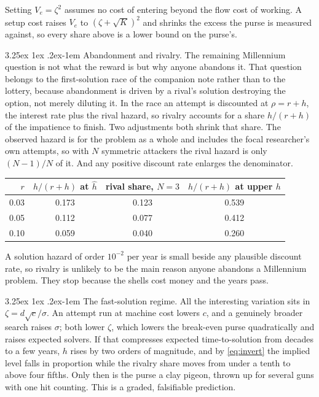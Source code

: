 \documentclass[11pt]{article}
\makeatletter
\renewcommand\paragraph{\@startsection{paragraph}{4}{\z@}%
  {3.25ex \@plus1ex \@minus.2ex}{-1em}%
  {\normalfont\normalsize\itshape}}
\theoremstyle{itheads}
\makeatother
\begin{document}
Setting $V_{e}=\zeta^{2}$ assumes no cost of entering beyond the flow cost
of working. A setup cost raises $V_{e}$ to $(\zeta+\sqrt K)^{2}$ and shrinks
the excess the purse is measured against, so every share above is a lower
bound on the purse's.

\paragraph{Abandonment and rivalry.}
The remaining Millennium question is not what the reward is but why anyone
abandons it. That question belongs to the first-solution race of the
companion note rather than to the lottery, because abandonment is driven by
a rival's solution destroying the option, not merely diluting it. In the
race an attempt is discounted at $\rho=r+h$, the interest rate plus the
rival hazard, so rivalry accounts for a share $h/(r+h)$ of the impatience to
finish. Two adjustments both shrink that share. The observed hazard is for
the problem as a whole and includes the focal researcher's own attempts, so
with $N$ symmetric attackers the rival hazard is only $(N-1)/N$ of it. And
any positive discount rate enlarges the denominator.

\begin{center}
\begin{tabular}{rccc}
\toprule
$r$ & $h/(r+h)$ at $\hat h$ & rival share, $N=3$ & $h/(r+h)$ at upper $h$\\
\midrule
0.03 & 0.173 & 0.123 & 0.539\\
0.05 & 0.112 & 0.077 & 0.412\\
0.10 & 0.059 & 0.040 & 0.260\\
\bottomrule
\end{tabular}
\end{center}

A solution hazard of order $10^{-2}$ per year is small beside any plausible
discount rate, so rivalry is unlikely to be the main reason anyone abandons
a Millennium problem. They stop because the shells cost money and the years
pass.

\paragraph{The fast-solution regime.}
All the interesting variation sits in $\zeta=d\sqrt c/\sigma$. An attempt
run at machine cost lowers $c$, and a genuinely broader search raises
$\sigma$; both lower $\zeta$, which lowers the break-even purse
quadratically and raises expected solvers. If that compresses expected
time-to-solution from decades to a few years, $h$ rises by two orders of
magnitude, and by \eqref{eq:invert} the implied level falls in proportion
while the rivalry share moves from under a tenth to above four fifths. Only
then is the purse a clay pigeon, thrown up for several guns with one hit
counting. This is a graded, falsifiable prediction.
\end{document}
